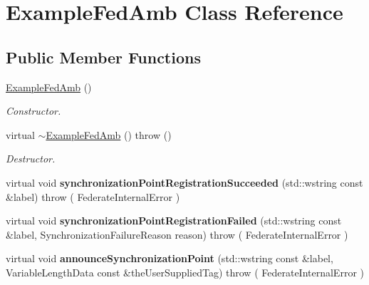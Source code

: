 \hypertarget{class_example_fed_amb}{
\section{ExampleFedAmb Class Reference}
\label{class_example_fed_amb}
}
\subsection*{Public Member Functions}
\begin{DoxyCompactItemize}
\item 
\hyperlink{class_example_fed_amb_ae067b0e893e88d7713e01d2bba478781}{ExampleFedAmb} ()
\begin{DoxyCompactList}\small\item\em Constructor. \item\end{DoxyCompactList}\item 
\hypertarget{class_example_fed_amb_a65b045a1989c20d40ba86c610d86014b}{
virtual \hyperlink{class_example_fed_amb_a65b045a1989c20d40ba86c610d86014b}{$\sim$ExampleFedAmb} ()  throw ()}
\label{class_example_fed_amb_a65b045a1989c20d40ba86c610d86014b}

\begin{DoxyCompactList}\small\item\em Destructor. \item\end{DoxyCompactList}\item 
\hypertarget{class_example_fed_amb_aa27c9d4b9c0cfbb59de2a973ec2040f7}{
virtual void {\bfseries synchronizationPointRegistrationSucceeded} (std::wstring const \&label)  throw ( FederateInternalError )}
\label{class_example_fed_amb_aa27c9d4b9c0cfbb59de2a973ec2040f7}

\item 
\hypertarget{class_example_fed_amb_a05407add5d67884ccbed9996da89a284}{
virtual void {\bfseries synchronizationPointRegistrationFailed} (std::wstring const \&label, SynchronizationFailureReason reason)  throw ( FederateInternalError )}
\label{class_example_fed_amb_a05407add5d67884ccbed9996da89a284}

\item 
\hypertarget{class_example_fed_amb_a1b929bbd1486db55d8e7e896dee56f24}{
virtual void {\bfseries announceSynchronizationPoint} (std::wstring const \&label, VariableLengthData const \&theUserSuppliedTag)  throw ( FederateInternalError )}
\label{class_example_fed_amb_a1b929bbd1486db55d8e7e896dee56f24}


\end{DoxyCompactItemize}

